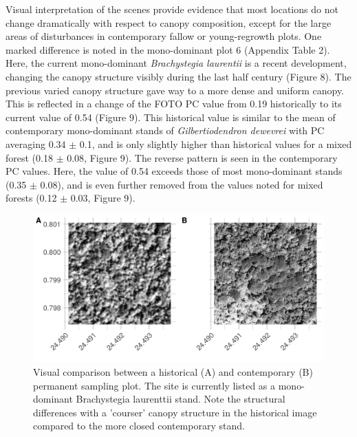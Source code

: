 \documentclass[remote sensing,article,submit,moreauthors,pdftex]{mdpi}
\begin{document}
Visual interpretation of the scenes provide evidence that most locations
do not change dramatically with respect to canopy composition, except
for the large areas of disturbances in contemporary fallow or
young-regrowth plots. One marked difference is noted in the
mono-dominant plot 6 (Appendix Table 2). Here, the current mono-dominant
\emph{Brachystegia laurentii} is a recent development, changing the
canopy structure visibly during the last half century (Figure 8). The
previous varied canopy structure gave way to a more dense and uniform
canopy. This is reflected in a change of the FOTO PC value from 0.19
historically to its current value of 0.54 (Figure 9). This historical
value is similar to the mean of contemporary mono-dominant stands of
\emph{Gilbertiodendron dewevrei} with PC averaging 0.34 \(\pm\) 0.1, and
is only slightly higher than historical values for a mixed forest (0.18
\(\pm\) 0.08, Figure 9). The reverse pattern is seen in the contemporary
PC values. Here, the value of 0.54 exceeds those of most mono-dominant
stands (0.35 \(\pm\) 0.08), and is even further removed from the values
noted for mixed forests (0.12 \(\pm\) 0.03, Figure 9).

\begin{figure}

{\centering \includegraphics[width=1\linewidth]{./figures/visual_comparison_psp} 

}

\caption{Visual comparison between a historical (A) and contemporary (B) permanent sampling plot. The site is currently listed as a mono-dominant Brachystegia laurenttii stand. Note the structural differences with a 'courser' canopy structure in the historical image compared to the more closed contemporary stand.}\label{fig:unnamed-chunk-12}
\end{figure}
\end{document}
